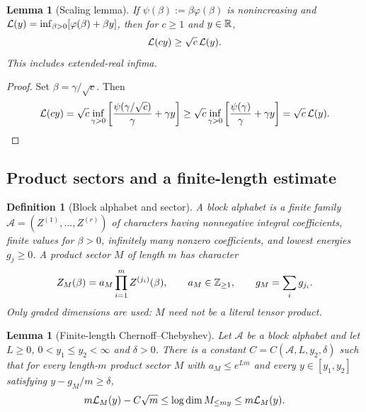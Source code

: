 \documentclass[10pt,a4paper]{article}
\numberwithin{equation}{section}
\newtheorem{lemma}[theorem]{Lemma}\newtheorem{proposition}[theorem]{Proposition}
\newtheorem{definition}[theorem]{Definition}
\theoremstyle{remark}\newtheorem{remark}[theorem]{Remark}\newtheorem{question}[theorem]{Question}
\begin{document}
\begin{lemma}[Scaling lemma]\label{lem:scaling}
If $\psi(\beta):=\beta\varphi(\beta)$ is nonincreasing and $\mathcal L(y)=\inf_{\beta>0}[\varphi(\beta)+\beta y]$, then for $c\ge1$ and $y\in\mathbb R$,
\begin{equation}\label{eq:scaling}\mathcal L(cy)\ge\sqrt c\,\mathcal L(y).\end{equation}
This includes extended-real infima.
\end{lemma}
\begin{proof}Set $\beta=\gamma/\sqrt c$. Then
\[
\mathcal L(cy)=\sqrt c\inf_{\gamma>0}\left[\frac{\psi(\gamma/\sqrt c)}\gamma+\gamma y\right]
\ge\sqrt c\inf_{\gamma>0}\left[\frac{\psi(\gamma)}\gamma+\gamma y\right]=\sqrt c\,\mathcal L(y).
\]\end{proof}

\subsection{Product sectors and a finite-length estimate}
\begin{definition}[Block alphabet and sector]
A block alphabet is a finite family $\mathcal A=(Z^{(1)},\ldots,Z^{(r)})$ of characters having nonnegative integral coefficients, finite values for $\beta>0$, infinitely many nonzero coefficients, and lowest energies $g_j\ge0$. A product sector $M$ of length $m$ has character
\[
Z_M(\beta)=a_M\prod_{i=1}^m Z^{(j_i)}(\beta),\qquad a_M\in\mathbb Z_{\ge1},\qquad g_M=\sum_i g_{j_i}.
\]
Only graded dimensions are used: $M$ need not be a literal tensor product.
\end{definition}
\begin{lemma}[Finite-length Chernoff--Chebyshev]\label{lem:chebyshev}
Let $\mathcal A$ be a block alphabet and let $L\ge0$, $0<y_1\le y_2<\infty$ and $\delta>0$. There is a constant $C=C(\mathcal A,L,y_2,\delta)$ such that for every length-$m$ product sector $M$ with $a_M\le e^{Lm}$ and every $y\in[y_1,y_2]$ satisfying $y-g_M/m\ge\delta$,
\begin{equation}\label{eq:cheb}
m\mathcal L_M(y)-C\sqrt m\le\log\operatorname{dim} M_{\le my}\le m\mathcal L_M(y).
\end{equation}
\end{lemma}
\end{document}
